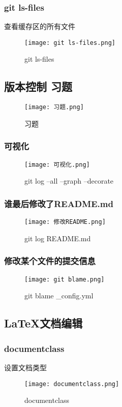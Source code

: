\documentclass{ctexart}
\begin{document}
\subsubsection{git ls-files}
查看缓存区的所有文件
\begin{figure}[h]
    \centering
    \texttt{[image: git ls-files.png]}
    \caption{git ls-files}
    \label{fig:enter-label}
\end{figure}

\subsection{版本控制 习题}
\begin{figure}[h]
    \centering
    \texttt{[image: 习题.png]}
    \caption{习题}
    \label{fig:enter-label}
\end{figure}
\subsubsection{可视化}
\begin{figure}[h]
    \centering
    \texttt{[image: 可视化.png]}
    \caption{git log --all --graph --decorate}
    \label{fig:enter-label}
\end{figure}
\subsubsection{谁最后修改了README.md}
\begin{figure}[h]
    \centering
    \texttt{[image: 修改README.png]}
    \caption{git log README.md}
    \label{fig:enter-label}
\end{figure}
\subsubsection{修改某个文件的提交信息}
\begin{figure}[h]
    \centering
    \texttt{[image: git blame.png]}
    \caption{git blame _config.yml}
    \label{fig:enter-label}
\end{figure}



\subsection{\LaTeX 文档编辑}
\subsubsection{documentclass}
设置文档类型
\begin{figure}[h]
    \centering
    \texttt{[image: documentclass.png]}
    \caption{documentclass}
    \label{fig:enter-label}
\end{figure}
\end{document}
